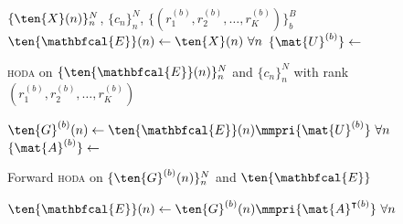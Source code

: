 \begin{algorithmic}[1]
  \Require $\{\ten{X}(n)\}_n^N$, $\{c_n\}_n^N$,
  $\{(r_1^{(b)},r_2^{(b)},\ldots,r_K^{(b)})\}_b^B$
  \State $\ten{\mathbfcal{E}}(n)\gets\ten{X}(n)\ \forall n$
  \State $\{\mat{U}^{(b)}\}\gets$ \parbox[t]{5cm}{\textsc{hoda} on $\{\ten{\mathbfcal{E}}(n)\}_n^N$ and
  $\{c_n\}_n^N$ with rank $(r_1^{(b)},r_2^{(b)},\ldots,r_K^{(b)})$}
  \State $\ten{G}^{(b)}(n)\gets\ten{\mathbfcal{E}}(n)\mmpri{\mat{U}^{(b)}}\
  \forall n$
  \State $\{\mat{A}^{(b)}\}\gets$ \parbox[t]{5cm}{Forward \textsc{hoda} on
  $\{\ten{G}^{(b)}(n)\}_n^N$ and $\ten{\mathbfcal{E}}$}
  \State
  $\ten{\mathbfcal{E}}(n)\gets\ten{G}^{(b)}(n)\mmpri{\mat{A}^{\intercal(b)}}\
  \forall n$
  \EndFor
\end{algorithmic}
